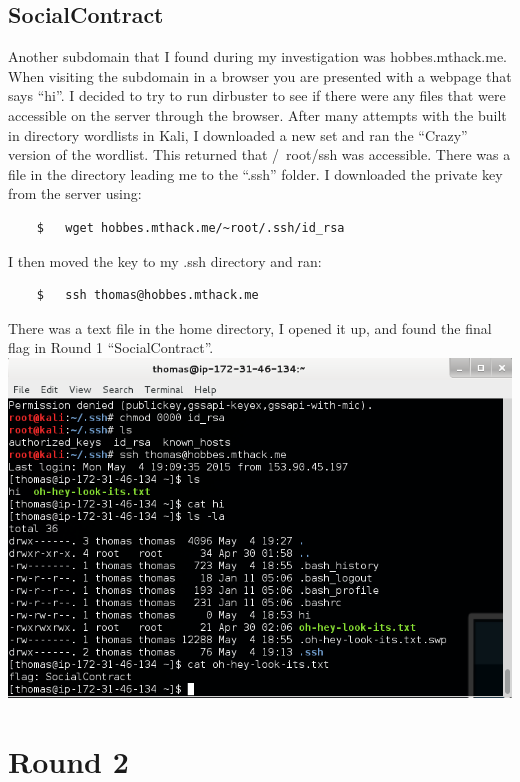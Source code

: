 \documentclass[12pt]{report}
\newcommand{\mychapter}[2]{
    \setcounter{chapter}{#1}
    \setcounter{section}{0}
    \chapter*{#2}
    \addcontentsline{toc}{chapter}{#2}
}
\begin{document}
\section{SocialContract}
Another subdomain that I found during my investigation was hobbes.mthack.me. When visiting the subdomain in a browser you are presented with a webpage that says ``hi''. I decided to try to run dirbuster to see if there were any files that were accessible on the server through the browser. After many attempts with the built in directory wordlists in Kali, I downloaded a new set and ran the ``Crazy'' version of the wordlist. This returned that /~root/ssh was accessible. There was a file in the directory leading me to the ``.ssh'' folder. I downloaded the private key from the server using:\\
	\begin{verbatim}
	$	wget hobbes.mthack.me/~root/.ssh/id_rsa
	\end{verbatim}

I then moved the key to my .ssh directory and ran:
	\begin{verbatim}
	$	ssh thomas@hobbes.mthack.me
	\end{verbatim}

There was a text file in the home directory, I opened it up, and found the final flag in Round 1 ``SocialContract''.\\
\includegraphics[scale=0.33, width=\linewidth]{SocialContract.png}


\mychapter{3}{Round 2}
\end{document}
